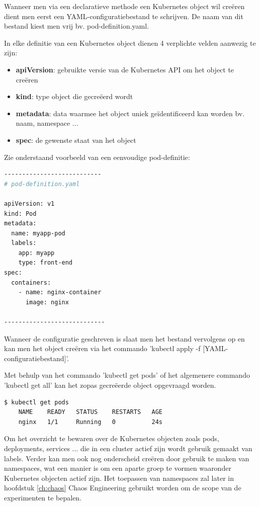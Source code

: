 Wanneer men via een declaratieve methode een Kubernetes object wil creëren dient men eerst een YAML-configuratiebestand te schrijven. De naam van dit bestand kiest men vrij bv. pod-definition.yaml.

In elke definitie van een Kubernetes object dienen 4 verplichte velden aanwezig te zijn:
\begin{itemize}
    \item {\bf apiVersion}: gebruikte versie van de Kubernetes API om het object te creëren
    \item {\bf kind}: type object die gecreëerd wordt
    \item {\bf metadata}: data waarmee het object uniek geïdentificeerd kan worden bv. naam, namespace ...
    \item {\bf spec}: de gewenste staat van het object
\end{itemize}

Zie onderstaand voorbeeld van een eenvoudige pod-definitie:

\begin{lstlisting}[language=bash]
---------------------------
# pod-definition.yaml

apiVersion: v1
kind: Pod
metadata:
  name: myapp-pod
  labels:
    app: myapp
    type: front-end
spec:
  containers:
    - name: nginx-container
      image: nginx

----------------------------
\end{lstlisting}

Wanneer de configuratie geschreven is slaat men het bestand vervolgens op en kan men het object creëren via het commando 'kubectl apply -f [YAML-configuratiebestand]'. 

Met behulp van het commando 'kubectl get pods' of het algemenere commando 'kubectl get all' kan het zopas gecreëerde object opgevraagd worden. 

\begin{lstlisting}[language=bash]
    $ kubectl get pods
    NAME    READY   STATUS    RESTARTS   AGE
    nginx   1/1     Running   0          24s
\end{lstlisting}

Om het overzicht te bewaren over de Kubernetes objecten zoals pods, deployments, services ... die in een cluster actief zijn wordt gebruik gemaakt van labels. Verder kan men ook nog onderscheid creëren door gebruik te maken van namespaces, wat een manier is om een aparte groep te vormen waaronder Kubernetes objecten actief zijn. Het toepassen van namespaces zal later in hoofdstuk \ref{ch:chaos} Chaos Engineering gebruikt worden om de scope van de experimenten te bepalen. 

